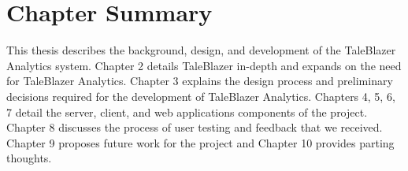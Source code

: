 \section{Chapter Summary}
This thesis describes the background, design, and development of the TaleBlazer Analytics system. Chapter 2 details TaleBlazer in-depth and expands on the need for TaleBlazer Analytics. Chapter 3 explains the design process and preliminary decisions required for the development of TaleBlazer Analytics. Chapters 4, 5, 6, 7 detail the server, client, and web applications components of the project. Chapter 8 discusses the process of user testing and feedback that we received. Chapter 9 proposes future work for the project and Chapter 10 provides parting thoughts. 




